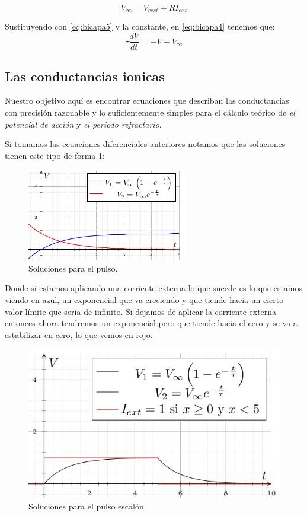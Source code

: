 \begin{equation}
 V_{\infty} = V_{rest} + RI_{ext}
 \label{eq:bicapa5}
\end{equation}

Sustituyendo con \ref{eq:bicapa5} y la constante, en \ref{eq:bicapa4} tenemos que:
\begin{equation}
 \tau\dfrac{dV}{dt} = -V + V_{\infty}
 \label{eq:bicapa6}
\end{equation}

\subsection{Las conductancias ionicas}
Nuestro objetivo aquí es encontrar ecuaciones que describan las conductancias con precisión razonable y lo suficientemente simples para el cálculo teórico de \emph{el potencial de acción} y \emph{el período refractario}. 

Si tomamos las ecuaciones diferenciales anteriores notamos que las soluciones tienen este tipo de forma \ref{fig:graficaX}:

\begin{figure}[h]
 \centering
 \includegraphics[scale=0.8]{../Figuras/solPulso1.png}
 \caption{Soluciones para el pulso.}
 \label{fig:graficaX}
\end{figure}


Donde si estamos aplicando una corriente externa lo que sucede es lo que estamos viendo en azul, un exponencial que va creciendo y que tiende hacia un cierto valor límite que sería de infinito. Si dejamos de aplicar la corriente externa entonces ahora tendremos un exponencial pero que tiende hacia el cero y se va a estabilizar en cero, lo que vemos en rojo. 

\begin{figure}[h]
 \centering
 \includegraphics[scale=0.5]{../Figuras/solPulso2.png}
 \caption{Soluciones para el pulso escalón.}
 \label{fig:graficaX1}
\end{figure}

